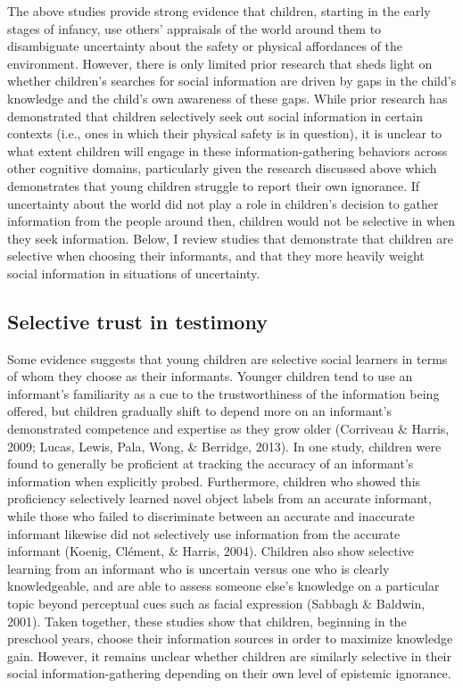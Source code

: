 \documentclass[man]{apa6}
\theoremstyle{definition}
\theoremstyle{definition}
\theoremstyle{definition}
\theoremstyle{remark}
\begin{document}
The above studies provide strong evidence that children, starting in the
early stages of infancy, use others' appraisals of the world around them
to disambiguate uncertainty about the safety or physical affordances of
the environment. However, there is only limited prior research that
sheds light on whether children's searches for social information are
driven by gaps in the child's knowledge and the child's own awareness of
these gaps. While prior research has demonstrated that children
selectively seek out social information in certain contexts (i.e., ones
in which their physical safety is in question), it is unclear to what
extent children will engage in these information-gathering behaviors
across other cognitive domains, particularly given the research
discussed above which demonstrates that young children struggle to
report their own ignorance. If uncertainty about the world did not play
a role in children's decision to gather information from the people
around then, children would not be selective in when they seek
information. Below, I review studies that demonstrate that children are
selective when choosing their informants, and that they more heavily
weight social information in situations of uncertainty.

\subsection{Selective trust in
testimony}\label{selective-trust-in-testimony}

Some evidence suggests that young children are selective social learners
in terms of whom they choose as their informants. Younger children tend
to use an informant's familiarity as a cue to the trustworthiness of the
information being offered, but children gradually shift to depend more
on an informant's demonstrated competence and expertise as they grow
older (Corriveau \& Harris, 2009; Lucas, Lewis, Pala, Wong, \& Berridge,
2013). In one study, children were found to generally be proficient at
tracking the accuracy of an informant's information when explicitly
probed. Furthermore, children who showed this proficiency selectively
learned novel object labels from an accurate informant, while those who
failed to discriminate between an accurate and inaccurate informant
likewise did not selectively use information from the accurate informant
(Koenig, Clément, \& Harris, 2004). Children also show selective
learning from an informant who is uncertain versus one who is clearly
knowledgeable, and are able to assess someone else's knowledge on a
particular topic beyond perceptual cues such as facial expression
(Sabbagh \& Baldwin, 2001). Taken together, these studies show that
children, beginning in the preschool years, choose their information
sources in order to maximize knowledge gain. However, it remains unclear
whether children are similarly selective in their social
information-gathering depending on their own level of epistemic
ignorance.
\end{document}
